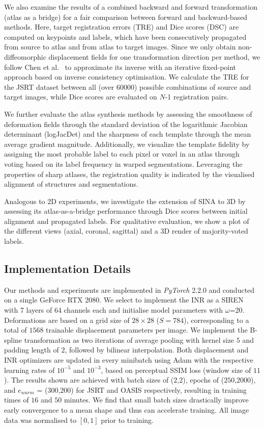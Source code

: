 We also examine the results of a combined backward and forward transformation (atlas as a bridge) for a fair comparison between forward and backward-based methods. Here, target registration errors (TRE) and Dice scores (DSC) are computed on keypoints and labels, which have been consecutively propagated from source to atlas and from atlas to target images. Since we only obtain non-diffeomorphic displacement fields for one transformation direction per method, we follow Chen et al.~\cite{chen2008simple} to approximate its inverse with an iterative fixed-point approach based on inverse consistency optimisation. We calculate the TRE for the JSRT dataset between all (over $60000$) possible combinations of source and target images, while Dice scores are evaluated on $N$-1 registration pairs. 

We further evaluate the atlas synthesis methods by assessing the smoothness of deformation fields through the standard deviation of the logarithmic Jacobian determinant (logJacDet) and the sharpness of each template through the mean average gradient magnitude. Additionally, we visualize the template fidelity by assigning the most probable label to each pixel or voxel in an atlas through voting based on its label frequency in warped segmentations. Leveraging the properties of sharp atlases, the registration quality is indicated by the visualised alignment of structures and segmentations. 


Analogous to 2D experiments, we investigate the extension of SINA to 3D by assessing its atlas-as-a-bridge performance through Dice scores between initial alignment and propagated labels. For qualitative evaluation, we show a plot of the different views (axial, coronal, sagittal) and a 3D render of majority-voted labels.


\subsection{Implementation Details}
Our methods and experiments are implemented in \emph{PyTorch} 2.2.0 and conducted on a single GeForce RTX 2080. We select to implement the INR as a SIREN~\cite{sitzmann2019siren} with 7 layers of 64 channels each and initialise model parameters with $\omega$=20. Deformations are based on a grid size of $28\times 28$ ($S=784$), corresponding to a total of $1568$ trainable displacement parameters per image. We implement the B-spline transformation as two iterations of average pooling with kernel size $5$ and padding length of $2$, followed by bilinear interpolation. 
Both displacement and INR optimizers are updated in every minibatch using Adam with the respective learning rates of $10^{-5}$ and $10^{-3}$, based on perceptual SSIM loss (window size of $11$). The results shown are achieved with batch sizes of ($2$,$2$), epochs of ($250$,$2000$), and  $e_{warm}$ = ($300$,$200$) for JSRT and OASIS respectively, resulting in training times of $16$ and $50$ minutes. We find that small batch sizes drastically improve early convergence to a mean shape and thus can accelerate training. All image data was normalised to $[0,1]$ prior to training.

